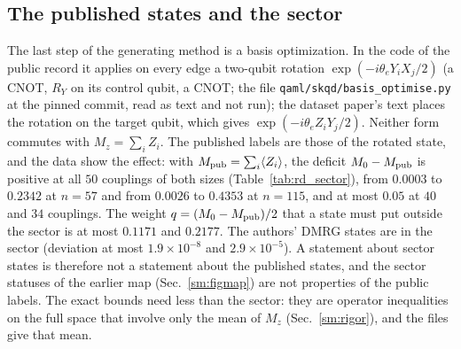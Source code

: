 \documentclass[aps,prx,onecolumn,10pt,nofootinbib,longbibliography,floatfix]{revtex4-2}
\theoremstyle{remark}
\newcommand{\de}{\delta e}
\begin{document}
\subsection{The published states and the sector}
\label{sm:public_sector}
The last step of the generating method is a basis optimization. In the code of the public record it applies on
every edge a two-qubit rotation $\exp(-i\theta_eY_iX_j/2)$ (a CNOT, $R_Y$ on its control qubit, a CNOT; the file %
\texttt{qaml/\allowbreak skqd/\allowbreak basis\_optimise.py} at the pinned commit, read as text and not run); the
dataset paper's text places the rotation on the target qubit, which gives $\exp(-i\theta_eZ_iY_j/2)$. Neither form %
commutes with $M_z=\sum_iZ_i$. The published labels are those of the
rotated state, and the data show the effect: with $M_{\rm pub}=\sum_i\langle Z_i\rangle$, the deficit $M_0-M_{\rm pub}$
is positive at all $50$ couplings of both sizes (Table~\ref{tab:rd_sector}), from $0.0003$ to $0.2342$ at $n=57$ and %
from $0.0026$ to $0.4353$ at $n=115$, and at most $0.05$ at $40$ and $34$ couplings. The weight %
$q=(M_0-M_{\rm pub})/2$ that a state must put outside the sector is at most $0.1171$ and $0.2177$. The authors' DMRG %
states are in the sector (deviation at most $1.9\times10^{-8}$ and $2.9\times10^{-5}$). A statement about sector states %
is therefore not a statement about the published states, and the sector statuses of the earlier map
(Sec.~\ref{sm:figmap}) are not properties of the public labels. The exact bounds need less than the sector: they are
operator inequalities on the full space that involve only the mean of $M_z$ (Sec.~\ref{sm:rigor}), and the files
give that mean.

\def\SMcap{The published states against the N\'eel sector, at every coupling. $M_0-M_{\rm pub}$: deficit of the sum of %
the published site magnetizations below its sector value; $q=(M_0-M_{\rm pub})/2$; $\de_{\rm pub}=(E_{\rm pub}-E_0)/n$,
with $E_0$ our DMRG reference at the stored couplings and the authors' DMRG value elsewhere. $^\dagger$: test
couplings; $^\ddagger$: in neither the training nor the test set.}\def\SMlab{tab:rd_sector}

\end{document}
